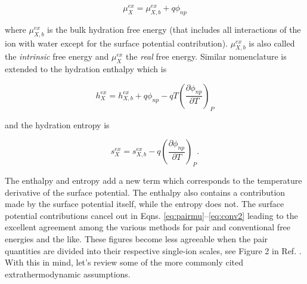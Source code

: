 \begin{intro}
  \begin{equation} 
    \mu_X^{ex} = \mu_{X,b}^{ex} + q\phi_{np}
    \label{eq:echemmu1}
  \end{equation}

  \noindent where $\mu_{X,b}^{ex}$ is the bulk hydration free energy (that includes all interactions of the ion with water except for the surface potential 
  contribution). $\mu_{X,b}^{ex}$ is also called the \emph{intrinsic} free energy\cite{hunenberger2011sp} and $\mu_X^{ex}$ the \emph{real} free energy. Similar
  nomenclature is extended to the hydration enthalpy which is
  
  \begin{equation}
    h_X^{ex} = h_{X,b}^{ex} + q\phi_{np} - qT\left(\frac{\partial \phi_{np}}{\partial T}\right)_P
    \label{eq:echemh1}
  \end{equation}

  \noindent and the hydration entropy\cite{lynden1997hydrophobic} is

  \begin{equation}
    s_X^{ex} = s_{X,b}^{ex} - q\left(\frac{\partial \phi_{np}}{\partial T}\right)_P.
    \label{eq:echem1}
  \end{equation}

   \noindent The enthalpy and entropy add a new term which corresponds to the temperature derivative of the surface potential. The enthalpy also contains a contribution
   made by the surface potential itself, while the entropy does not. The surface potential contributions cancel out in Eqns. \ref{eq:pairmu}--\ref{eq:conv2} leading to the
   excellent agreement among the various methods for pair and conventional free energies and the like. These figures become less agreeable when the pair quantities are 
   divided into their respective single-ion scales, see Figure 2 in Ref. \cite{lamoureux2006absolute}. With this in mind, let's review some of the more commonly cited 
   extrathermodynamic assumptions.
   

\end{intro}
